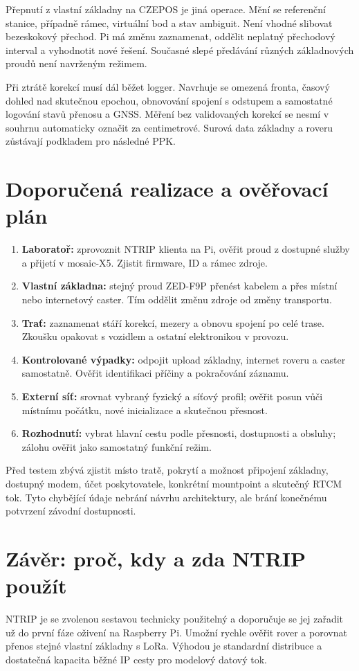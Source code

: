 \documentclass[11pt,a4paper]{article}
\begin{document}
Přepnutí z vlastní základny na CZEPOS je jiná operace. Mění se referenční stanice, případně rámec, virtuální bod a stav ambiguit. Není vhodné slibovat bezeskokový přechod. Pi má změnu zaznamenat, oddělit neplatný přechodový interval a vyhodnotit nové řešení. Současné slepé předávání různých základnových proudů není navrženým režimem.

Při ztrátě korekcí musí dál běžet logger. Navrhuje se omezená fronta, časový dohled nad skutečnou epochou, obnovování spojení s odstupem a samostatné logování stavů přenosu a GNSS. Měření bez validovaných korekcí se nesmí v souhrnu automaticky označit za centimetrové. Surová data základny a roveru zůstávají podkladem pro následné PPK.

\section{Doporučená realizace a ověřovací plán}
\begin{enumerate}
\item \textbf{Laboratoř:} zprovoznit NTRIP klienta na Pi, ověřit proud z dostupné služby a přijetí v mosaic-X5. Zjistit firmware, ID a rámec zdroje.
\item \textbf{Vlastní základna:} stejný proud ZED-F9P přenést kabelem a přes místní nebo internetový caster. Tím oddělit změnu zdroje od změny transportu.
\item \textbf{Trať:} zaznamenat stáří korekcí, mezery a obnovu spojení po celé trase. Zkoušku opakovat s vozidlem a ostatní elektronikou v provozu.
\item \textbf{Kontrolované výpadky:} odpojit upload základny, internet roveru a caster samostatně. Ověřit identifikaci příčiny a pokračování záznamu.
\item \textbf{Externí síť:} srovnat vybraný fyzický a síťový profil; ověřit posun vůči místnímu počátku, nové inicializace a skutečnou přesnost.
\item \textbf{Rozhodnutí:} vybrat hlavní cestu podle přesnosti, dostupnosti a obsluhy; zálohu ověřit jako samostatný funkční režim.
\end{enumerate}
Před testem zbývá zjistit místo tratě, pokrytí a možnost připojení základny, dostupný modem, účet poskytovatele, konkrétní mountpoint a skutečný RTCM tok. Tyto chybějící údaje nebrání návrhu architektury, ale brání konečnému potvrzení závodní dostupnosti.

\section{Závěr: proč, kdy a zda NTRIP použít}
NTRIP je se zvolenou sestavou technicky použitelný a doporučuje se jej zařadit už do první fáze oživení na Raspberry Pi. Umožní rychle ověřit rover a porovnat přenos stejné vlastní základny s LoRa. Výhodou je standardní distribuce a dostatečná kapacita běžné IP cesty pro modelový datový tok.
\end{document}
